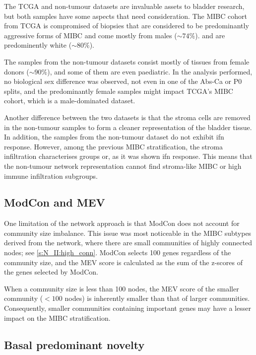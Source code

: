 The TCGA and non-tumour datasets are invaluable assets to bladder research, but both samples have some aspects that need consideration. The MIBC cohort from TCGA is compromised of biopsies that are considered to be predominantly aggressive forms of MIBC and come mostly from males (\(\sim74\%\)). and are predominently white (\(\sim80\%\)).

The samples from the non-tumour datasets consist mostly of tissues from female donors (\(\sim90\%\)), and some of them are even paediatric. In the analysis performed, no biological sex difference was observed, not even in one of the Abs-Ca or P0 splits, and the predominantly female samples might impact TCGA's MIBC cohort, which is a male-dominated dataset.

Another difference between the two datasets is that the stroma cells are removed in the non-tumour samples to form a cleaner representation of the bladder tissue. In addition, the samples from the non-tumour dataset do not exhibit \acrfull{ifn} response. However, among the previous MIBC stratification, the stroma infiltration characterises groups or, as it was shown \acrshort{ifn} response. This means that the non-tumour network representation cannot find stroma-like MIBC or high immune infiltration subgroups.


\subsection*{ModCon and MEV}

One limitation of the network approach is that ModCon does not account for community size imbalance. This issue was most noticeable in the MIBC subtypes derived from the network, where there are small communities of highly connected nodes; see \cref{s:N_II:high_conn}. ModCon selects 100 genes regardless of the community size, and the MEV score is calculated as the sum of the z-scores of the genes selected by ModCon.

When a community size is less than 100 nodes, the MEV score of the smaller community (\(<100\) nodes) is inherently smaller than that of larger communities. Consequently, smaller communities containing important genes may have a lesser impact on the MIBC stratification.


\subsection*{Basal predominant novelty}

